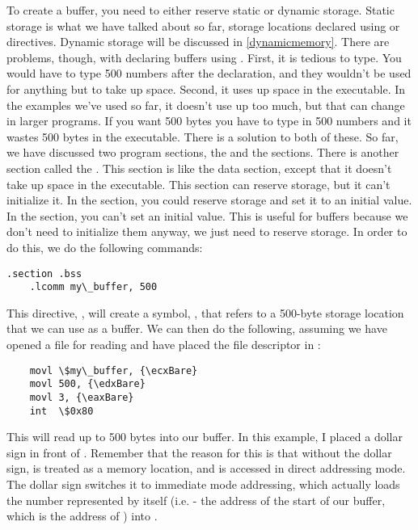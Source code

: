 To create a buffer, you need to either reserve static or dynamic storage.
Static storage is what we have talked about so far, storage locations
declared using  or  directives.
Dynamic storage will be discussed in \autoref{dynamicmemory}.  
There are problems, though, with declaring buffers using .
First, it is tedious to type.  You would have to type 500 numbers after
the  declaration, and they wouldn't be used
for anything but to take up space.
Second, it uses up space in the executable.  In the examples we've
used so far, it doesn't use up too much, but that can change in larger 
programs.  If you want 500 bytes you have to type in 500 numbers and it 
wastes 500
bytes in the executable.  There is a solution to both of these.  So far,
we have discussed two program sections, the  and
the  sections.  There is another section called
the .  This section is like the data section, except
that it doesn't take up space in the executable.  This section can
reserve storage, but it can't initialize it.  In the 
section, you could reserve storage and set it to an initial value.  In the
 section, you can't set an initial value.  This is
useful for buffers because we don't need to initialize them anyway, we
just need to reserve storage.  In order to do this, we do the following
commands:

\begin{simpletyping}
\begin{lstlisting}
.section .bss
	.lcomm my\_buffer, 500
\end{lstlisting}
\end{simpletyping}

This directive, , will create a symbol, , that refers to 
a 500-byte storage location that we can use as a buffer.  We can then do
the following, assuming we have opened a file for reading and have placed
the file descriptor in {\ebxReg}:

\begin{simpletyping}
\begin{lstlisting}
	movl \$my\_buffer, {\ecxBare}
	movl 500, {\edxBare}
	movl 3, {\eaxBare}
	int  \$0x80
\end{lstlisting}
\end{simpletyping}

This will read up to 500 bytes into our buffer.  In this example, I placed
a dollar sign in front of .  Remember that the 
reason for this is that without the dollar sign, 
 is treated as a memory location, and is
accessed in direct addressing mode.  The dollar sign switches it to immediate mode addressing,
which actually loads the number represented by  
itself (i.e. - the address of the start of our buffer, which is the address 
of ) into {\ecxReg}.

